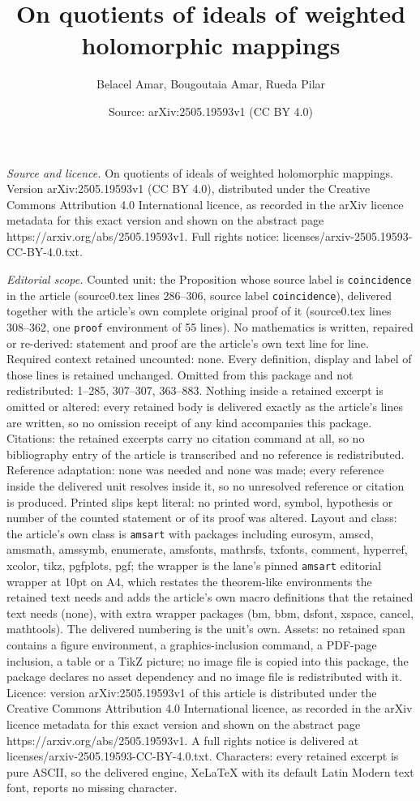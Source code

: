 \documentclass[10pt,a4paper]{amsart}
\title[On quotients of ideals of weighted holomorphic mappings]{On quotients of ideals of weighted holomorphic mappings}
\author{Belacel Amar, Bougoutaia Amar, Rueda Pilar}
\date{Source: arXiv:2505.19593v1 (CC BY 4.0)}
\begin{document}
\maketitle

\noindent\emph{Source and licence.} On quotients of ideals of weighted holomorphic mappings. Version arXiv:2505.19593v1 (CC BY 4.0), distributed under the Creative Commons Attribution 4.0 International licence, as recorded in the arXiv licence metadata for this exact version and shown on the abstract page https://arxiv.org/abs/2505.19593v1. Full rights notice: licenses/arxiv-2505.19593-CC-BY-4.0.txt.\par\smallskip

\noindent\textit{Editorial scope.} Counted unit: the Proposition whose source label is \texttt{coincidence} in the article (source0.tex lines 286--306, source label \texttt{coincidence}), delivered together with the article's own complete original proof of it (source0.tex lines 308--362, one \texttt{proof} environment of 55 lines). No mathematics is written, repaired or re-derived: statement and proof are the article's own text line for line. Required context retained uncounted: none. Every definition, display and label of those lines is retained unchanged. Omitted from this package and not redistributed: 1--285, 307--307, 363--883. Nothing inside a retained excerpt is omitted or altered: every retained body is delivered exactly as the article's lines are written, so no omission receipt of any kind accompanies this package. Citations: the retained excerpts carry no citation command at all, so no bibliography entry of the article is transcribed and no reference is redistributed. Reference adaptation: none was needed and none was made; every reference inside the delivered unit resolves inside it, so no unresolved reference or citation is produced. Printed slips kept literal: no printed word, symbol, hypothesis or number of the counted statement or of its proof was altered. Layout and class: the article's own class is \texttt{amsart} with packages including eurosym, amscd, amsmath, amssymb, enumerate, amsfonts, mathrsfs, txfonts, comment, hyperref, xcolor, tikz, pgfplots, pgf; the wrapper is the lane's pinned \texttt{amsart} editorial wrapper at 10pt on A4, which restates the theorem-like environments the retained text needs and adds the article's own macro definitions that the retained text needs (none), with extra wrapper packages (bm, bbm, dsfont, xspace, cancel, mathtools). The delivered numbering is the unit's own. Assets: no retained span contains a figure environment, a graphics-inclusion command, a PDF-page inclusion, a table or a TikZ picture; no image file is copied into this package, the package declares no asset dependency and no image file is redistributed with it. Licence: version arXiv:2505.19593v1 of this article is distributed under the Creative Commons Attribution 4.0 International licence, as recorded in the arXiv licence metadata for this exact version and shown on the abstract page https://arxiv.org/abs/2505.19593v1. A full rights notice is delivered at licenses/arxiv-2505.19593-CC-BY-4.0.txt. Characters: every retained excerpt is pure ASCII, so the delivered engine, XeLaTeX with its default Latin Modern text font, reports no missing character.
\end{document}
